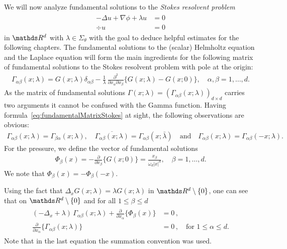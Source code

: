 We will now analyze fundamental solutions to the \emph{Stokes resolvent problem}
\begin{align}
  \label{eq:stokesResolventProblem}
  \begin{alignedat}{1}
  -\Delta u + \nabla \phi + \lambda u &= 0 \\
  \div u &= 0
  \end{alignedat}
\end{align}
in $\R^d$ with $\lambda \in \Sigma_\theta$ with the goal to deduce helpful estimates for the following chapters.
  The fundamental solutions to the (scalar) Helmholtz equation and the Laplace equation will form the main ingredients for the following matrix of fundamental solutions to the Stokes resolvent problem with pole at the origin:
  \begin{align}
    \label{eq:fundamentalMatrixStokes}
    \Gamma_{\alpha\beta}(x;\lambda) = G(x; \lambda) \delta_{\alpha\beta} - \frac{1}{\lambda}\, \frac{\partial^2}{\partial x_\alpha \partial x_\beta} \Big\{ G(x; \lambda) - G(x; 0) \Big\}, \quad \alpha,\beta = 1,\dots,d.
  \end{align}
  As the matrix of fundamental solutions $\Gamma(x; \lambda) = (\Gamma_{\alpha\beta}(x; \lambda))_{d \times d}$ carries two arguments it cannot be confused with the Gamma function.
  Having formula~\eqref{eq:fundamentalMatrixStokes} at sight, the following observations are obvious:
  \begin{align*}
    \Gamma_{\alpha\beta}(x; \lambda) = \Gamma_{\beta\alpha}(x; \lambda), \quad 
    \overline{\Gamma_{\alpha\beta}(x; \lambda)} = \Gamma_{\alpha\beta}(x; \bar\lambda)
    \quad\text{and}\quad
    \Gamma_{\alpha\beta}(x; \lambda) = \Gamma_{\alpha\beta}(-x; \lambda).
  \end{align*}
  For the pressure, we define the vector of fundamental solutions
  \begin{align}
    \label{eq:fundamentalVectorPressure}
      \Phi_\beta(x) = -\frac{\partial}{\partial x_\beta} \Big\{ G(x; 0) \Big\} = \frac{x_\beta}{\omega_d |x|^d}, \quad \beta= 1,\dots,d.
  \end{align}
  We note that $\Phi_\beta(x) = -\Phi_\beta(-x)$.

  Using the fact that $\Delta_x G(x; \lambda) = \lambda G(x; \lambda)$ in $\R^d \setminus \{0\}$, one can see that on $\R^d \setminus \{0\}$ and for all $1 \leq \beta \leq d$
  \begin{align}
    \label{eq:solutionStokesSystem}
    \begin{alignedat}{1}
      (-\Delta_x + \lambda)\, \Gamma_{\alpha\beta}(x;\lambda) + \frac{\partial}{\partial x_\alpha} \Big\{ \Phi_\beta(x) \Big\} &= 0\,, \\
      \frac{\partial}{\partial x_\alpha} \Big\{ \Gamma_{\alpha\beta} (x; \lambda) \Big\} &= 0\,, \quad\text{for } 1 \leq \alpha \leq d.
    \end{alignedat}
  \end{align}
  Note that in the last equation the summation convention was used.

